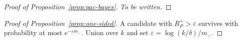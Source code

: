 \begin{proof}[Proof of Proposition~\ref{prop:pac-bayes}]
\emph{To be written.}
\end{proof}

\begin{proof}[Proof of Proposition~\ref{prop:one-sided}]
A candidate with $R^+_P>\varepsilon$ survives with probability at most $e^{-\varepsilon m_-}$.
Union over $k$ and set $\varepsilon=\log(k/\delta)/m_-$.
\end{proof}
